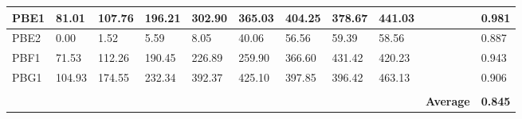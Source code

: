 \begin{tabular}{|l|l|l|l|l|l|l|l|l|l|l|}
PBE1           & 81.01          & 107.76         & 196.21         & 302.90         & 365.03         & 404.25         & 378.67         & 441.03         &                  & 0.981             \\ \hline
PBE2           & 0.00           & 1.52           & 5.59           & 8.05           & 40.06          & 56.56          & 59.39          & 58.56          &                  & 0.887             \\ \hline
PBF1           & 71.53          & 112.26         & 190.45         & 226.89         & 259.90         & 366.60         & 431.42         & 420.23         &                  & 0.943             \\ \hline
PBG1           & 104.93         & 174.55         & 232.34         & 392.37         & 425.10         & 397.85         & 396.42         & 463.13         &                  & 0.906             \\ \hline
               &                &                &                &                &                &                &                &                &                  &                   \\ \hline
               &                &                &                &                &                &                &                &                & \textbf{Average} & \textbf{0.845}    \\ \hline
\end{tabular}